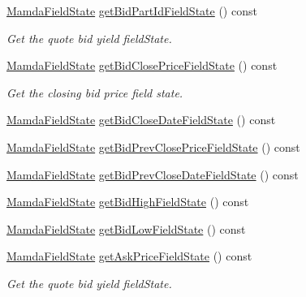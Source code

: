 \begin{CompactItemize}
\hyperlink{namespaceWombat_93aac974f2ab713554fd12a1fa3b7d2a}{Mamda\-Field\-State} \hyperlink{classWombat_1_1MamdaQuoteListener_01e681d0b51718516807df702714f7ba}{get\-Bid\-Part\-Id\-Field\-State} () const 
\begin{CompactList}\small\item\em Get the quote bid yield field\-State. \item\end{CompactList}\item 
\hyperlink{namespaceWombat_93aac974f2ab713554fd12a1fa3b7d2a}{Mamda\-Field\-State} \hyperlink{classWombat_1_1MamdaQuoteListener_168cfd897d5c3f532d49e36c0e380db3}{get\-Bid\-Close\-Price\-Field\-State} () const 
\begin{CompactList}\small\item\em Get the closing bid price field state. \item\end{CompactList}\item 
\hyperlink{namespaceWombat_93aac974f2ab713554fd12a1fa3b7d2a}{Mamda\-Field\-State} \hyperlink{classWombat_1_1MamdaQuoteListener_a61f3b17ec3755be6696abb38db5d65e}{get\-Bid\-Close\-Date\-Field\-State} () const 
\item 
\hyperlink{namespaceWombat_93aac974f2ab713554fd12a1fa3b7d2a}{Mamda\-Field\-State} \hyperlink{classWombat_1_1MamdaQuoteListener_71d4b27da209e537018ed78be16b9b35}{get\-Bid\-Prev\-Close\-Price\-Field\-State} () const 
\item 
\hyperlink{namespaceWombat_93aac974f2ab713554fd12a1fa3b7d2a}{Mamda\-Field\-State} \hyperlink{classWombat_1_1MamdaQuoteListener_03a1620ee6559319e5d24a9519f9ba83}{get\-Bid\-Prev\-Close\-Date\-Field\-State} () const 
\item 
\hyperlink{namespaceWombat_93aac974f2ab713554fd12a1fa3b7d2a}{Mamda\-Field\-State} \hyperlink{classWombat_1_1MamdaQuoteListener_8c2949e6f90e88d5d2fcabebf0c5e173}{get\-Bid\-High\-Field\-State} () const 
\item 
\hyperlink{namespaceWombat_93aac974f2ab713554fd12a1fa3b7d2a}{Mamda\-Field\-State} \hyperlink{classWombat_1_1MamdaQuoteListener_d35cb68b55f7b1bef90b4b9097958c62}{get\-Bid\-Low\-Field\-State} () const 
\item 
\hyperlink{namespaceWombat_93aac974f2ab713554fd12a1fa3b7d2a}{Mamda\-Field\-State} \hyperlink{classWombat_1_1MamdaQuoteListener_28dd174c3b718a3def1d09b04ab68577}{get\-Ask\-Price\-Field\-State} () const 
\begin{CompactList}\small\item\em Get the quote bid yield field\-State. \item\end{CompactList}\item 

\end{CompactItemize}

